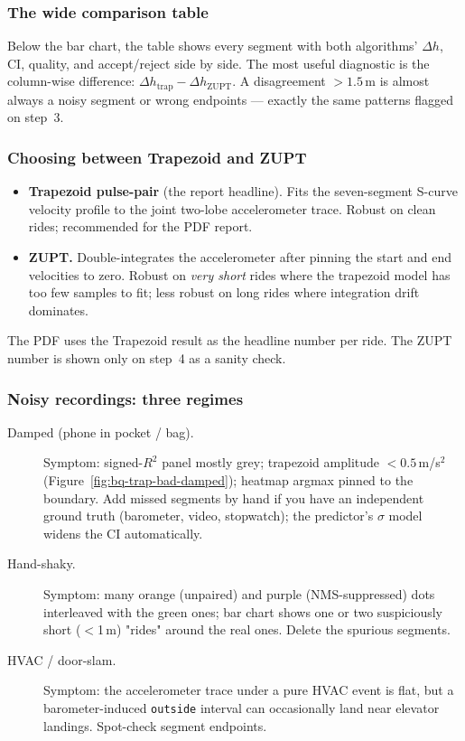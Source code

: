 \subsubsection{The wide comparison table}

Below the bar chart, the table shows every segment with both
algorithms' $\Delta h$, CI, quality, and accept/reject side by
side. The most useful diagnostic is the column-wise difference:
$\Delta h_{\text{trap}} - \Delta h_{\text{ZUPT}}$. A
disagreement $>1.5$\,m is almost always a noisy segment or wrong
endpoints --- exactly the same patterns flagged on step~3.

\subsubsection{Choosing between Trapezoid and ZUPT}

\begin{itemize}
  \item \textbf{Trapezoid pulse-pair} (the report headline). Fits
    the seven-segment S-curve velocity profile to the joint
    two-lobe accelerometer trace. Robust on clean rides; recommended
    for the PDF report.
  \item \textbf{ZUPT.} Double-integrates the accelerometer after
    pinning the start and end velocities to zero. Robust on
    \emph{very short} rides where the trapezoid model has too few
    samples to fit; less robust on long rides where integration
    drift dominates.
\end{itemize}

The PDF uses the Trapezoid result as the headline number per ride.
The ZUPT number is shown only on step~4 as a sanity check.

\subsubsection{Noisy recordings: three regimes}

\begin{description}
  \item[Damped (phone in pocket / bag).] Symptom: signed-$R^2$
    panel mostly grey; trapezoid amplitude $<0.5$\,m/s$^2$
    (Figure~\ref{fig:bq-trap-bad-damped}); heatmap argmax pinned
    to the boundary. Add missed segments by hand if you have an
    independent ground truth (barometer, video, stopwatch); the
    predictor's $\sigma$ model widens the CI automatically.
  \item[Hand-shaky.] Symptom: many orange (unpaired) and purple
    (NMS-suppressed) dots interleaved with the green ones; bar
    chart shows one or two suspiciously short ($<$1\,m) "rides"
    around the real ones. Delete the spurious segments.
  \item[HVAC / door-slam.] Symptom: the accelerometer trace under
    a pure HVAC event is flat, but a barometer-induced
    \texttt{outside} interval can occasionally land near elevator
    landings. Spot-check segment endpoints.
\end{description}


